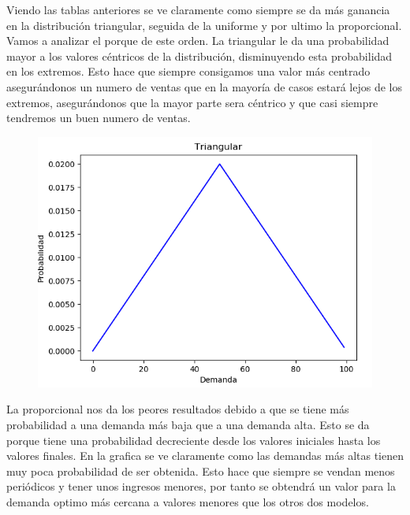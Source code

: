 \documentclass[]{article}
\begin{document}
Viendo las tablas anteriores se ve claramente como siempre se da más ganancia en la distribución triangular, seguida de la uniforme y por ultimo la proporcional.
Vamos a analizar el porque de este orden.
\newline
\newline
La triangular le da una probabilidad mayor a los valores céntricos de la distribución, disminuyendo esta probabilidad en los extremos. Esto hace que siempre consigamos una valor más centrado asegurándonos un numero de ventas que en la mayoría de casos estará lejos de los extremos, asegurándonos que la mayor parte sera céntrico y que casi siempre tendremos un buen numero de ventas. 

\begin{figure}[H]
	\centering
	\includegraphics[width=1\linewidth]{img/screenshot002}
	\caption{}
	\label{fig:screenshot002}
\end{figure}
\newpage
La proporcional nos da los peores resultados debido a que se tiene más probabilidad a una demanda más baja que a una demanda alta. Esto se da porque tiene una probabilidad decreciente desde los valores iniciales hasta los valores finales. En la grafica se ve claramente como las demandas más altas tienen muy poca probabilidad de ser obtenida. Esto hace que siempre se vendan menos periódicos y tener unos ingresos menores, por tanto se obtendrá un valor para la demanda optimo más cercana a valores menores que los otros dos modelos.
\end{document}

